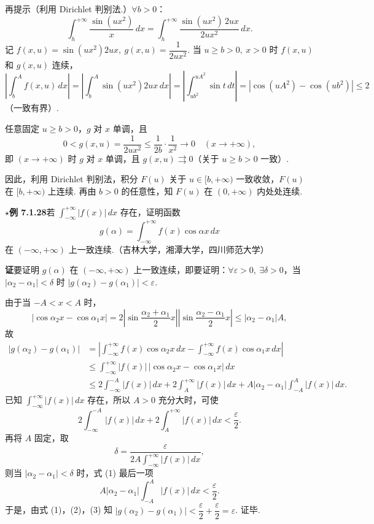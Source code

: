 \documentclass[UTF8, 12pt, fontset=fandol, oneside]{ctexart}
\begin{document}
再提示（利用 Dirichlet 判别法.）$\forall b>0$：
\[
\int_h^{+\infty}\frac{\sin(ux^2)}{x}\,dx
=\int_h^{+\infty}\frac{\sin(ux^2)\,2ux}{2ux^2}\,dx.
\]
记 $f(x,u)=\sin(ux^2)2ux,\ g(x,u)=\dfrac1{2ux^2}$. 当 $u\ge b>0,\ x>0$ 时 $f(x,u)$ 和 $g(x,u)$ 连续，
\[
\left|\int_b^A f(x,u)\,dx\right|
=\left|\int_b^A\sin(ux^2)2ux\,dx\right|
=\left|\int_{ub^2}^{uA^2}\sin t\,dt\right|
=|\cos(uA^2)-\cos(ub^2)|\le2
\]
（一致有界）.

任意固定 $u\ge b>0$，$g$ 对 $x$ 单调，且
\[
0<g(x,u)=\frac1{2ux^2}\le\frac1{2b}\cdot\frac1{x^2}\to0\quad(x\to+\infty),
\]
即 $(x\to+\infty)$ 时 $g$ 对 $x$ 单调，且 $g(x,u)\rightrightarrows0$（关于 $u\ge b>0$ 一致）.

因此，利用 Dirichlet 判别法，积分 $F(u)$ 关于 $u\in[b,+\infty)$ 一致收敛，$F(u)$ 在 $[b,+\infty)$ 上连续. 再由 $b>0$ 的任意性，知 $F(u)$ 在 $(0,+\infty)$ 内处处连续.

\noindent\textbf{$\star$例 7.1.28}\quad 若 $\displaystyle\int_{-\infty}^{+\infty}|f(x)|\,dx$ 存在，证明函数
\[
g(\alpha)=\int_{-\infty}^{+\infty}f(x)\cos\alpha x\,dx
\]
在 $(-\infty,+\infty)$ 上一致连续.（吉林大学，湘潭大学，四川师范大学）

\noindent\textbf{证}\quad 要证明 $g(\alpha)$ 在 $(-\infty,+\infty)$ 上一致连续，即要证明：$\forall\varepsilon>0,\ \exists\delta>0$，当 $|\alpha_2-\alpha_1|<\delta$ 时 $|g(\alpha_2)-g(\alpha_1)|<\varepsilon$.

由于当 $-A<x<A$ 时，
\[
|\cos\alpha_2x-\cos\alpha_1x|
=2\left|\sin\frac{\alpha_2+\alpha_1}{2}x\right|
\left|\sin\frac{\alpha_2-\alpha_1}{2}x\right|
\le|\alpha_2-\alpha_1|A,
\]
故
\begin{equation}
\begin{aligned}
|g(\alpha_2)-g(\alpha_1)|
&=\left|\int_{-\infty}^{+\infty}f(x)\cos\alpha_2x\,dx
-\int_{-\infty}^{+\infty}f(x)\cos\alpha_1x\,dx\right|\\
&\le\int_{-\infty}^{+\infty}|f(x)|\,|\cos\alpha_2x-\cos\alpha_1x|\,dx\\
&\le2\int_{-\infty}^{-A}|f(x)|\,dx+2\int_A^{+\infty}|f(x)|\,dx
+A|\alpha_2-\alpha_1|\int_{-A}^A|f(x)|\,dx.
\end{aligned}
\tag{1}
\end{equation}
已知 $\displaystyle\int_{-\infty}^{+\infty}|f(x)|\,dx$ 存在，所以 $A>0$ 充分大时，可使
\[
2\int_{-\infty}^{-A}|f(x)|\,dx+2\int_A^{+\infty}|f(x)|\,dx<\frac{\varepsilon}{2}.
\tag{2}
\]
再将 $A$ 固定，取
\[
\delta=\frac{\varepsilon}{2A\displaystyle\int_{-\infty}^{+\infty}|f(x)|\,dx},
\]
则当 $|\alpha_2-\alpha_1|<\delta$ 时，式 (1) 最后一项
\[
A|\alpha_2-\alpha_1|\int_{-A}^{A}|f(x)|\,dx<\frac{\varepsilon}{2}.
\tag{3}
\]
于是，由式 (1)，(2)，(3) 知 $|g(\alpha_2)-g(\alpha_1)|<\dfrac{\varepsilon}{2}+\dfrac{\varepsilon}{2}=\varepsilon$. 证毕.
\end{document}
